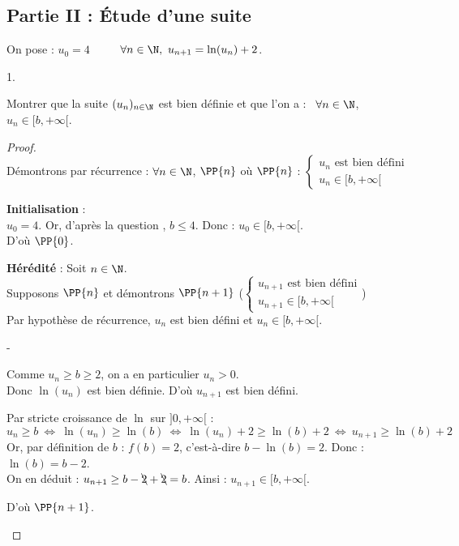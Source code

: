 \documentclass[11pt]{article}%
\begin{document}
\newpage


\subsection*{Partie II : Étude d'une suite}

\noindent
On pose : $u_0=4$ \ \  \ \ $\forall n \in \N, \ u_{n+1} =
\ln(u_n) +2$.

\begin{noliste}{1.}
  \setlength{\itemsep}{4mm}
  \setcounter{enumi}{3}
\item Montrer que la suite $(u_n)_{n\in \N}$ est bien définie et que
  l'on a : \ $\forall n \in \N$, $u_n \in [b, +\infty[$.
  
  \begin{proof}~\\
    Démontrons par récurrence : $\forall n\in \N$, $\PP{n}$ \quad où
    \quad $\PP{n}$ : $\left\{
    \begin{array}{l}
      \text{$u_n$ est bien défini}\\
      u_n \in [b,+\infty[
    \end{array}
    \right.$
    \begin{noliste}{\fitem}
      \item {\bf Initialisation} : \\
      $u_0=4$. Or, d'après la question , $b \leq 4$. Donc :
      $u_0 \in [b, +\infty[$.\\
      D'où $\PP{0}$.
      
      \item {\bf Hérédité} : Soit $n\in \N$.\\
      Supposons $\PP{n}$ et démontrons $\PP{n+1}$ (\ie $\left\{
      \begin{array}{l}
        \text{$u_{n+1}$ est bien défini}\\
        u_{n+1} \in [b,+\infty[
      \end{array}
      \right.$)\\[.2cm]
      Par hypothèse de récurrence, $u_n$ est bien défini et $u_n \in 
      [b,+\infty[$.
      \begin{noliste}{-}
	\item Comme $u_n \geq b \geq 2$, on a en particulier $u_n>0$.\\
	Donc $\ln(u_n)$ est bien définie. D'où $u_{n+1}$ est bien 
	défini.
	
	\item Par stricte croissance de $\ln$ sur $]0,+\infty[$ :
	\[
	  u_n \geq b \ \Leftrightarrow \ \ln(u_n) \geq \ln(b) 
	  \ \Leftrightarrow \ \ln(u_n) +2 \geq \ln(b)+2 
	  \ \Leftrightarrow \ u_{n+1} \geq \ln(b)+2
	\]
	Or, par définition de $b$ : $f(b)=2$, c'est-à-dire 
	$b-\ln(b)=2$. Donc : $\ln(b) = b-2$.\\
	On en déduit : $u_{n+1} \geq b - \bcancel{2} + \bcancel{2}
	=b$.
	Ainsi : $u_{n+1} \in [b,+\infty[$.
      \end{noliste}
      D'où $\PP{n+1}$.
    \end{noliste}
    \conc{Par principe de récurrence, on obtient que $(u_n)$ est bien 
    définie et :
    $\forall n\in \N, \ u_n \in [b,+\infty[$.}
    

\end{proof}
\end{noliste}
\end{document}
